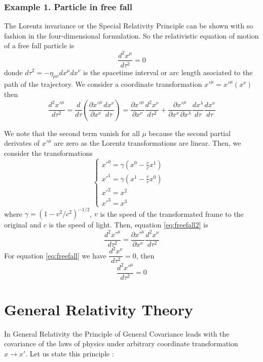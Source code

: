 \documentclass[10pt, letterpaper, oneside]{book}
\theoremstyle{theorem} %
\theoremstyle{theorem} %
\theoremstyle{definition}
\theoremstyle{remark}
\theoremstyle{definition}
\theoremstyle{definition}
\theoremstyle{theorem}
\begin{document}
\subsubsection*{Example 1. Particle in free fall}
The Lorentz invariance or the  Special Relativity Principle can be shown with so fashion in the four-dimensional formulation. So the relativistic equation of motion of a free fall particle is
\begin{equation}
	\frac{d^2x^\mu}{d\tau^2}=0 \label{eq:freefall}
\end{equation}
donde $d\tau^2=-\eta_{\mu\nu}dx^\mu dx^\nu$ is the spacetime interval or arc length asociated to the path of the trajectory. We consider a coordinate transformation $x'^\mu=x'^\mu(x^\nu)$ then
\begin{equation}
	\frac{d^2x'^\mu}{d\tau^2} = \frac{d}{d\tau}\left( \frac{\partial x'^\mu}{\partial x^\nu}\frac{dx^\nu}{d\tau} \right) = \frac{\partial x'^\mu}{\partial x^\nu}\frac{d^2x^\nu}{d\tau^2} + \frac{\partial x'^\mu}{\partial x^\nu\,\partial x^\lambda} \frac{dx^\lambda}{d\tau} \frac{dx^\nu}{d\tau} \label{eq:freefall2}
\end{equation}

We note that the second term vanish for all $\mu$ because the second partial derivates of $x'^\mu$ are zero as the Lorentz transformations are linear. Then, we consider the transformations
\begin{equation}
	\begin{cases}
		x'^0=\gamma\left(x^0-\frac{v}{c} x^1\right)  & \\
		x'^1=\gamma\left(x^1-\frac{v}{c} x^0 \right) & \\
		x'^2 = x^2 & \\
		x'^3 = x^3 
	\end{cases}
\end{equation}
where $\gamma=(1-v^2/c^2)^{-1/2}$, $v$ is the speed of the transformated frame to the original and $c$ is the speed of light. Then, equation \ref{eq:freefall2} is
\begin{equation}
	\frac{d^2x'^\mu}{d\tau^2} = \frac{\partial x'^\mu}{\partial x^\nu}\frac{d^2x^\nu}{d\tau^2}
\end{equation}
For equation \ref{eq:freefall} we have $\dfrac{d^2x^\nu}{d\tau^2}=0$, then
\begin{equation}
	\frac{d^2x'^\mu}{d\tau^2} = 0
\end{equation}

\section{General Relativity Theory}
In General Relativity the Principle of General Covariance leads with the covariance of the laws of physics under arbitrary coordinate transformation $x \to x'$. Let us state this principle \cite{weinberg}:
\end{document}
